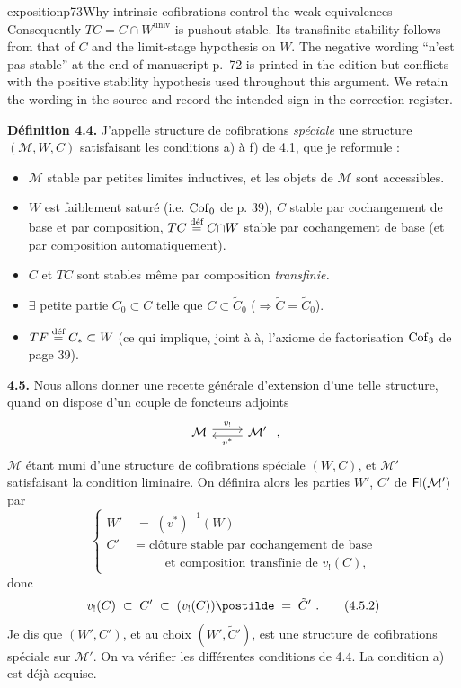 \begin{dcomment}{exposition}{p73}{Why intrinsic cofibrations control the weak equivalences}
Consequently $TC=C\cap W^{\mathrm{univ}}$ is pushout-stable. Its transfinite stability follows from that of $C$ and the limit-stage hypothesis on $W$. The negative wording ``n'est pas stable'' at the end of manuscript p.~72 is printed in the edition but conflicts with the positive stability hypothesis used throughout this argument. We retain the wording in the source and record the intended sign in the correction register.
\end{dcomment}


\textbf{Définition 4.4.} J'appelle structure de cofibrations \textit{spéciale} une structure $(\mathcal{M}, W, C)$ satisfaisant les conditions a) à f) de 4.1, que je reformule :
\begin{itemize}[leftmargin=3em]
\item[\circled{a}] $\mathcal{M}$ stable par petites limites inductives, et les objets de $\mathcal{M}$ sont accessibles.
\item[\circled{b}] $W$ est faiblement saturé (i.e. $\Cof_0$ de p. 39), $C$ stable par cochangement de base et par composition, $TC \defeq C{\cap}W$ stable par cochangement de base (et par composition automatiquement).
\item[\circled{b$'$}] $C$ et $TC$ sont stables même par composition \textit{transfinie.}
\item[\circled{c}] $\exists$ petite partie $C_0 \subset C$ telle que $C \subset \tilde{C}_0$ ($\Longrightarrow \tilde{C} = \tilde{C}_0$).
\item[\circled{d}] $TF \defeq C_* \subset W$ (ce qui implique, joint à à, l'axiome de factorisation $\Cof_3$ de page 39).
\end{itemize}

\textbf{4.5.} Nous allons donner une recette générale d'extension d'une telle structure, quand on dispose d'un couple de foncteurs adjoints
\[
\begin{tikzcd}
\mathcal{M} \arrow[r, shift left, "v_!"] & \mathcal{M}' \arrow[l, shift left, "v^*"]
\end{tikzcd}
\ ,
\]
$\mathcal{M}$ étant muni d'une structure de cofibrations spéciale $(W, C)$, et $\mathcal{M}'$ satisfaisant la condition liminaire. On définira alors les parties $W'$, $C'$ de $\Fl(\mathcal{M}')$
par
\[
\left\{
\begin{aligned}
W' \;&=\; (v^*)^{-1}(W) \\
C' \;&=\; \text{clôture stable par cochangement de base} \\
&\phantom{\;=\;}\ \ \text{et composition transfinie de } v_!(C),
\end{aligned}
\right. \tag*{(4.5.1)}
\]
donc
\[
v_!(C) \;\subset\; C' \;\subset\; (v_!(C))\postilde \;=\; \tilde{C}'\ . \tag*{(4.5.2)}
\]
Je dis que $(W', C')$, et au choix $(W', \tilde{C}')$, est une structure de cofibrations spéciale sur $\mathcal{M}'$. On va vérifier les différentes conditions de 4.4. La condition a) est déjà acquise.

